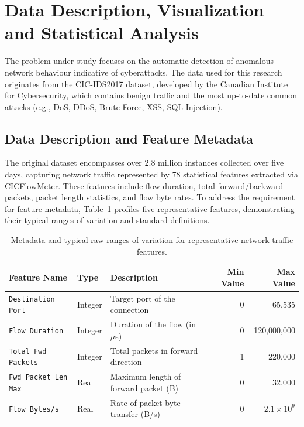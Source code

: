 \section{Data Description, Visualization and Statistical Analysis}

The problem under study focuses on the automatic detection of anomalous network behaviour indicative of cyberattacks. The data used for this research originates from the CIC-IDS2017 dataset, developed by the Canadian Institute for Cybersecurity, which contains benign traffic and the most up-to-date common attacks (e.g., DoS, DDoS, Brute Force, XSS, SQL Injection).

\subsection{Data Description and Feature Metadata}
The original dataset encompasses over 2.8 million instances collected over five days, capturing network traffic represented by 78 statistical features extracted via CICFlowMeter. These features include flow duration, total forward/backward packets, packet length statistics, and flow byte rates. To address the requirement for feature metadata, Table~\ref{tab:metadata} profiles five representative features, demonstrating their typical ranges of variation and standard definitions.

\begin{table}[ht]
  \centering
  \caption{Metadata and typical raw ranges of variation for representative network traffic features.}
  \label{tab:metadata}
  \footnotesize
  \begin{tabular}{lllrr}
    \toprule
    \textbf{Feature Name} & \textbf{Type} & \textbf{Description} & \textbf{Min Value} & \textbf{Max Value} \\
    \midrule
    \texttt{Destination Port}  & Integer    & Target port of the connection & 0 & 65,535 \\
    \texttt{Flow Duration}     & Integer    & Duration of the flow (in $\mu$s) & 0 & 120,000,000 \\
    \texttt{Total Fwd Packets} & Integer    & Total packets in forward direction & 1 & 220,000 \\
    \texttt{Fwd Packet Len Max}& Real       & Maximum length of forward packet (B) & 0 & 32,000 \\
    \texttt{Flow Bytes/s}      & Real       & Rate of packet byte transfer (B/s) & 0 & $2.1\times 10^9$ \\
    \bottomrule
  \end{tabular}
\end{table}

